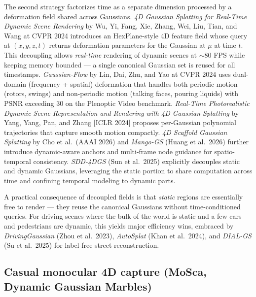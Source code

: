 \documentclass{article}
\begin{document}
The second strategy factorizes time as a separate dimension processed by a deformation field shared across Gaussians. \emph{4D Gaussian Splatting for Real-Time Dynamic Scene Rendering} by Wu, Yi, Fang, Xie, Zhang, Wei, Liu, Tian, and Wang at CVPR 2024 \cite{wu2024recentadvancesin3d} introduces an HexPlane-style 4D feature field whose query at \((x,y,z,t)\) returns deformation parameters for the Gaussian at \(\mu\) at time \(t\). This decoupling allows \emph{real-time} rendering of dynamic scenes at \(\sim 80\) FPS while keeping memory bounded --- a single canonical Gaussian set is reused for all timestamps. \emph{Gaussian-Flow} by Lin, Dai, Zhu, and Yao at CVPR 2024 \cite{lin2024gaussianflow4dreco} uses dual-domain (frequency + spatial) deformation that handles both periodic motion (rotors, swings) and non-periodic motion (talking faces, pouring liquids) with PSNR exceeding \(30\) on the Plenoptic Video benchmark. \emph{Real-Time Photorealistic Dynamic Scene Representation and Rendering with 4D Gaussian Splatting} by Yang, Yang, Pan, and Zhang {[}ICLR 2024{]} proposes per-Gaussian polynomial trajectories that capture smooth motion compactly. \emph{4D Scaffold Gaussian Splatting} by Cho et al.~(AAAI 2026) and \emph{Mango-GS} (Huang et al.~2026) further introduce dynamic-aware anchors and multi-frame node guidance for spatio-temporal consistency. \emph{SDD-4DGS} (Sun et al.~2025) explicitly decouples static and dynamic Gaussians, leveraging the static portion to share computation across time and confining temporal modeling to dynamic parts.

A practical consequence of decoupled fields is that \emph{static} regions are essentially free to render --- they reuse the canonical Gaussians without time-conditioned queries. For driving scenes where the bulk of the world is static and a few cars and pedestrians are dynamic, this yields major efficiency wins, embraced by \emph{DrivingGaussian} (Zhou et al.~2023), \emph{AutoSplat} (Khan et al.~2024), and \emph{DIAL-GS} (Su et al.~2025) for label-free street reconstruction.

\subsection{Casual monocular 4D capture (MoSca, Dynamic Gaussian Marbles)}\label{casual-monocular-4d-capture-mosca-dynamic-gaussian-marbles}
\end{document}

